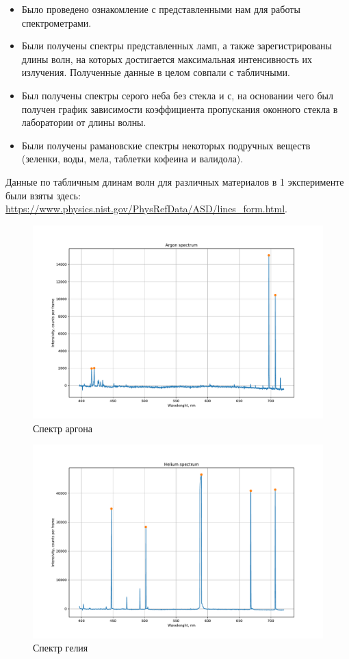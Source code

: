 \documentclass[a4paper, 12pt]{article}
\begin{document}
\begin{itemize}
	\item Было проведено ознакомление с представленными нам для работы спектрометрами.
	
	\item Были получены спектры представленных ламп, а также зарегистрированы длины волн, на которых достигается максимальная интенсивность их излучения. Полученные данные в целом совпали с табличными.
	
	\item Был получены спектры серого неба без стекла и с, на основании чего был получен график зависимости коэффициента пропускания оконного стекла в лаборатории от длины волны.
	
	\item Были получены рамановские спектры некоторых подручных веществ (зеленки, воды, мела, таблетки кофеина и валидола).
\end{itemize}

Данные по табличным длинам волн для различных материалов в 1 эксперименте были взяты здесь:  \href{https://www.physics.nist.gov/PhysRefData/ASD/lines_form.html}{https://www.physics.nist.gov/PhysRefData/ASD/lines\_form.html}.


\begin{figure}[H]
	\centering
	\includegraphics[width=0.9\linewidth]{argon}
	\caption{Спектр аргона}
	\label{fig:ar}
\end{figure}

\begin{figure}[H]
	\centering
	\includegraphics[width=0.9\linewidth]{helium}
	\caption{Спектр гелия}
	\label{fig:he}
\end{figure}
\end{document}
